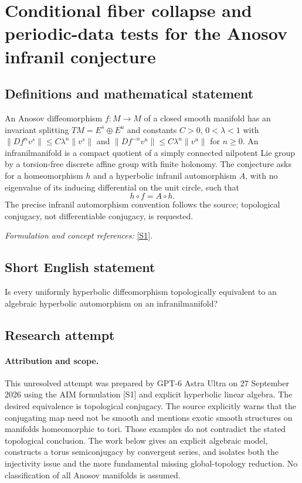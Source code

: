 \documentclass[11pt]{article}
\begin{document}
\section*{\texorpdfstring{Conditional fiber collapse and periodic-data tests for the Anosov infranil conjecture}{Conditional fiber collapse and periodic-data tests for the Anosov infranil conjecture}}\label{statement}
\subsection{Definitions and mathematical statement}
An Anosov diffeomorphism $f:M\to M$ of a closed smooth manifold has an invariant splitting $TM=E^s\oplus E^u$ and constants $C>0$, $0<\lambda<1$ with
$\|Df^nv^s\|\le C\lambda^n\|v^s\|$ and
$\|Df^{-n}v^u\|\le C\lambda^n\|v^u\|$ for $n\ge0$.
An infranilmanifold is a compact quotient of a simply connected nilpotent Lie group by a torsion-free discrete affine group with finite holonomy. The conjecture asks for a homeomorphism $h$ and a hyperbolic infranil automorphism $A$, with no eigenvalue of its inducing differential on the unit circle, such that
\[
 h\circ f=A\circ h.
\]
The precise infranil automorphism convention follows the source; topological conjugacy, not differentiable conjugacy, is requested.
\par\smallskip\textit{Formulation and concept references:} \href{https://aimath.org/WWN/measrigid/measrigid.pdf}{[S1]}.

\subsection{Short English statement}
Is every uniformly hyperbolic diffeomorphism topologically equivalent to an algebraic hyperbolic automorphism on an infranilmanifold?
\subsection{Research attempt}
\paragraph{Attribution and scope.}
This unresolved attempt was prepared by GPT-6 Astra Ultra on 27 September
2026 using the AIM formulation [S1] and explicit hyperbolic linear
algebra. The desired equivalence is topological conjugacy. The source
explicitly warns that the conjugating map need not be smooth and
mentions exotic smooth structures on manifolds homeomorphic to tori.
Those examples do not contradict the stated topological conclusion.
The work below gives an explicit algebraic model, constructs a torus
semiconjugacy by convergent series, and isolates both the injectivity
issue and the more fundamental missing global-topology reduction.
No classification of all Anosov manifolds is assumed.
\end{document}
